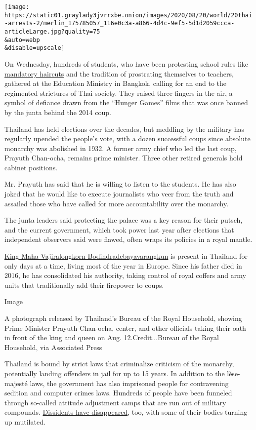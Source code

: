 \texttt{[image: https://static01.graylady3jvrrxbe.onion/images/2020/08/20/world/20thai-arrests-2/merlin\_175785057\_116e0c3a-a866-4d4c-9ef5-5d1d2059ccca-articleLarge.jpg?quality=75\\\&auto=webp\\\&disable=upscale]}

On Wednesday, hundreds of students, who have been protesting school
rules like
\href{https://www.nytimes3xbfgragh.onion/2020/08/11/world/asia/thailand-student-protest-military.html}{mandatory
haircuts} and the tradition of prostrating themselves to teachers,
gathered at the Education Ministry in Bangkok, calling for an end to the
regimented strictures of Thai society. They raised three fingers in the
air, a symbol of defiance drawn from the ``Hunger Games'' films that was
once banned by the junta behind the 2014 coup.

Thailand has held elections over the decades, but meddling by the
military has regularly upended the people's vote, with a dozen
successful coups since absolute monarchy was abolished in 1932. A former
army chief who led the last coup, Prayuth Chan-ocha, remains prime
minister. Three other retired generals hold cabinet positions.

Mr. Prayuth has said that he is willing to listen to the students. He
has also joked that he would like to execute journalists who veer from
the truth and assailed those who have called for more accountability
over the monarchy.

The junta leaders said protecting the palace was a key reason for their
putsch, and the current government, which took power last year after
elections that independent observers said were flawed, often wraps its
policies in a royal mantle.

\href{https://www.nytimes3xbfgragh.onion/2019/05/04/world/asia/thailand-king-maha-vajiralongkorn.html}{King
Maha Vajiralongkorn Bodindradebayavarangkun} is present in Thailand for
only days at a time, living most of the year in Europe. Since his father
died in 2016, he has consolidated his authority, taking control of royal
coffers and army units that traditionally add their firepower to coups.

Image

A photograph released by Thailand's Bureau of the Royal Household,
showing Prime Minister Prayuth Chan-ocha, center, and other officials
taking their oath in front of the king and queen on Aug.
12.Credit...Bureau of the Royal Household, via Associated Press

Thailand is bound by strict laws that criminalize criticism of the
monarchy, potentially landing offenders in jail for up to 15 years. In
addition to the lèse-majesté laws, the government has also imprisoned
people for contravening sedition and computer crimes laws. Hundreds of
people have been funneled through so-called attitude adjustment camps
that are run out of military compounds.
\href{https://www.nytimes3xbfgragh.onion/2020/06/26/world/asia/thailand-dissidents-disappeared-military.html}{Dissidents
have disappeared}, too, with some of their bodies turning up mutilated.

